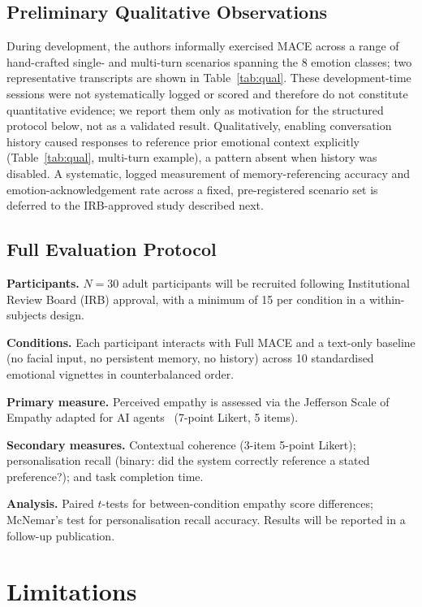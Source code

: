 \documentclass[sigconf, review=true]{acmart}
\begin{document}
\subsection{Preliminary Qualitative Observations}

During development, the authors informally exercised MACE across
a range of hand-crafted single- and multi-turn scenarios spanning
the 8 emotion classes; two representative transcripts are shown
in Table~\ref{tab:qual}.
These development-time sessions were not systematically logged or
scored and therefore do not constitute quantitative evidence; we
report them only as motivation for the structured protocol below,
not as a validated result.
Qualitatively, enabling conversation history caused responses to
reference prior emotional context explicitly (Table~\ref{tab:qual},
multi-turn example), a pattern absent when history was disabled.
A systematic, logged measurement of memory-referencing accuracy
and emotion-acknowledgement rate across a fixed, pre-registered
scenario set is deferred to the IRB-approved study described next.

\subsection{Full Evaluation Protocol}

\textbf{Participants.}
$N{=}30$ adult participants will be recruited following
Institutional Review Board (IRB) approval, with a minimum
of 15 per condition in a within-subjects design.

\textbf{Conditions.}
Each participant interacts with Full MACE and a text-only
baseline (no facial input, no persistent memory, no history)
across 10 standardised emotional vignettes in counterbalanced
order.

\textbf{Primary measure.}
Perceived empathy is assessed via the Jefferson Scale of
Empathy adapted for AI agents~\cite{hojat2001jse}
(7-point Likert, 5 items).

\textbf{Secondary measures.}
Contextual coherence (3-item 5-point Likert);
personalisation recall (binary: did the system correctly
reference a stated preference?); and task completion time.

\textbf{Analysis.}
Paired $t$-tests for between-condition empathy score
differences; McNemar's test for personalisation recall
accuracy.
Results will be reported in a follow-up publication.

\section{Limitations}
\label{sec:limitations}
\end{document}
